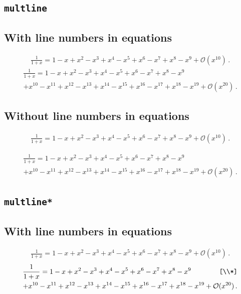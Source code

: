 \subsection*{\texttt{multline}}

\subsection*{With line numbers in equations}
\nextlipsum
\begin{multline}
  \frac{1}{1 + x} = 1 - x + x^{2} - x^{3} + x^{4} - x^{5} + x^{6} - x^{7} + x^{8} - x^{9} + \mathcal{O}(x^{10}) \,.
\end{multline}
\nextlipsum
\begin{multline}
  \frac{1}{1 + x} = 1 - x + x^{2} - x^{3} + x^{4} - x^{5} + x^{6} - x^{7} + x^{8} - x^{9} \\
  + x^{10} - x^{11} + x^{12} - x^{13} + x^{14} - x^{15} + x^{16} - x^{17} + x^{18} - x^{19} + \mathcal{O}(x^{20}) \,.
\end{multline}
\nextlipsum

\subsection*{Without line numbers in equations}
\nextlipsum
\begin{linenomath*}
\begin{multline}
  \frac{1}{1 + x} = 1 - x + x^{2} - x^{3} + x^{4} - x^{5} + x^{6} - x^{7} + x^{8} - x^{9} + \mathcal{O}(x^{10}) \,.
\end{multline}
\end{linenomath*}
\nextlipsum
\begin{linenomath*}
\begin{multline}
  \frac{1}{1 + x} = 1 - x + x^{2} - x^{3} + x^{4} - x^{5} + x^{6} - x^{7} + x^{8} - x^{9} \\
  + x^{10} - x^{11} + x^{12} - x^{13} + x^{14} - x^{15} + x^{16} - x^{17} + x^{18} - x^{19} + \mathcal{O}(x^{20}) \,.
\end{multline}
\end{linenomath*}
\nextlipsum

\subsection*{\texttt{multline*}}

\subsection*{With line numbers in equations}
\nextlipsum
\begin{multline*}
  \frac{1}{1 + x} = 1 - x + x^{2} - x^{3} + x^{4} - x^{5} + x^{6} - x^{7} + x^{8} - x^{9} + \mathcal{O}(x^{10}) \,.
\end{multline*}
\nextlipsum
\begin{multline*}
  \frac{1}{1 + x} = 1 - x + x^{2} - x^{3} + x^{4} - x^{5} + x^{6} - x^{7} + x^{8} - x^{9} \qquad\qquad\texttt{[\textbackslash\textbackslash{}*]}\\*
  + x^{10} - x^{11} + x^{12} - x^{13} + x^{14} - x^{15} + x^{16} - x^{17} + x^{18} - x^{19} + \mathcal{O}(x^{20}) \,.
\end{multline*}
\nextlipsum

